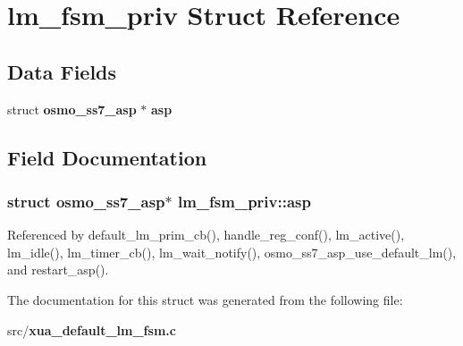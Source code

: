 \section{lm\+\_\+fsm\+\_\+priv Struct Reference}
\label{structlm__fsm__priv}
\subsection*{Data Fields}
\begin{DoxyCompactItemize}
\item 
struct {\bf osmo\+\_\+ss7\+\_\+asp} $\ast$ {\bf asp}
\end{DoxyCompactItemize}


\subsection{Field Documentation}
\subsubsection[{asp}]{\setlength{\rightskip}{0pt plus 5cm}struct {\bf osmo\+\_\+ss7\+\_\+asp}$\ast$ lm\+\_\+fsm\+\_\+priv\+::asp}\label{structlm__fsm__priv_ad30dee656a343fa3e97873fe56ab76ec}


Referenced by default\+\_\+lm\+\_\+prim\+\_\+cb(), handle\+\_\+reg\+\_\+conf(), lm\+\_\+active(), lm\+\_\+idle(), lm\+\_\+timer\+\_\+cb(), lm\+\_\+wait\+\_\+notify(), osmo\+\_\+ss7\+\_\+asp\+\_\+use\+\_\+default\+\_\+lm(), and restart\+\_\+asp().



The documentation for this struct was generated from the following file\+:\begin{DoxyCompactItemize}
\item 
src/{\bf xua\+\_\+default\+\_\+lm\+\_\+fsm.\+c}\end{DoxyCompactItemize}
